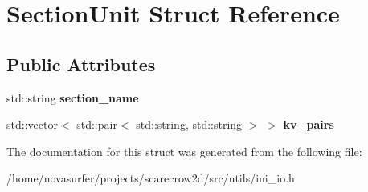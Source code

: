 \hypertarget{structSectionUnit}{}\section{Section\+Unit Struct Reference}
\label{structSectionUnit}
\subsection*{Public Attributes}
\begin{DoxyCompactItemize}
\item 
\mbox{\label{structSectionUnit_a4ffe8614d592effc23e4153d6e2bb2ac}} 
std\+::string {\bfseries section\+\_\+name}
\item 
\mbox{\label{structSectionUnit_a1e22c3fb60abe22805384c3d6c6b876d}} 
std\+::vector$<$ std\+::pair$<$ std\+::string, std\+::string $>$ $>$ {\bfseries kv\+\_\+pairs}
\end{DoxyCompactItemize}


The documentation for this struct was generated from the following file\+:\begin{DoxyCompactItemize}
\item 
/home/novasurfer/projects/scarecrow2d/src/utils/ini\+\_\+io.\+h\end{DoxyCompactItemize}
